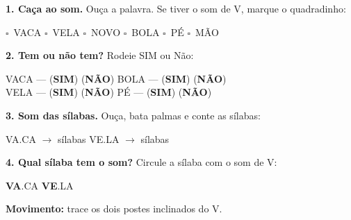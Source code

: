 \begin{somletra}
\textbf{1. Ca\c{c}a ao som.} Ou\c{c}a a palavra. Se tiver o som de V, marque o quadradinho:
\begin{center}
$\square$~VACA \quad $\square$~VELA \quad $\square$~NOVO \quad $\square$~BOLA \quad $\square$~P\'E \quad $\square$~M\~AO
\end{center}

\textbf{2. Tem ou n\~ao{} tem?} Rodeie SIM ou N\~ao:
\begin{center}
VACA --- (\textbf{SIM}) (\textbf{N\~AO}) \quad BOLA --- (\textbf{SIM}) (\textbf{N\~AO}) \\ VELA --- (\textbf{SIM}) (\textbf{N\~AO}) \quad P\'E --- (\textbf{SIM}) (\textbf{N\~AO})
\end{center}
\end{somletra}

\begin{somsilaba}
\textbf{3. Som das s\'ilabas.} Ou\c{c}a, bata palmas e conte as s\'ilabas:
\begin{center}
VA.CA $\rightarrow$ \underline{\hspace{1cm}} s\'ilabas \quad VE.LA $\rightarrow$ \underline{\hspace{1cm}} s\'ilabas
\end{center}

\textbf{4. Qual s\'ilaba tem o som?} Circule a s\'ilaba com o som de V:
\begin{center}
\textbf{VA}.CA \quad \textbf{VE}.LA
\end{center}
\end{somsilaba}



\begin{motricidade}
\textbf{Movimento:} trace os dois postes inclinados do V.
\begin{center}
\end{center}
\end{motricidade}

